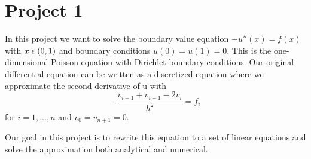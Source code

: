 \documentclass[a4paper,12pt, english]{article}
\begin{document}
\section*{Project 1}
In this project we want to solve the boundary value equation $ -u''(x) = f(x) $ with $ x \hspace{1mm} \epsilon \hspace{1mm}  (0,1) $ and boundary conditions $ u(0) = u(1) = 0 $. This is the one-dimensional Poisson equation with Dirichlet boundary conditions.
Our original differential equation can be written as a discretized equation where we approximate the second derivative of u with $$ - \frac{v_{i+1}+v_{i-1}-2v_{i}}{h^2} = f_{i} $$ 
for $ i = 1, ..., n $ and $ v_{0} = v_{n+1} = 0$.

Our goal in this project is to rewrite this equation to a set of linear equations and solve the approximation both analytical and numerical. 
\end{document}

